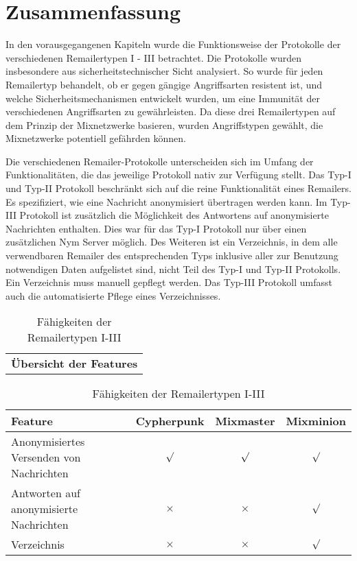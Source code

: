 \chapter{Zusammenfassung}

In den vorausgegangenen Kapiteln wurde die Funktionsweise der Protokolle der verschiedenen Remailertypen I - III betrachtet. Die Protokolle wurden insbesondere aus sicherheitstechnischer Sicht analysiert. So wurde für jeden Remailertyp behandelt, ob er gegen gängige Angriffsarten resistent ist, und welche Sicherheitsmechanismen entwickelt wurden, um eine Immunität der verschiedenen Angriffsarten zu gewährleisten.  Da diese drei Remailertypen auf dem Prinzip der Mixnetzwerke basieren, wurden Angriffstypen gewählt, die Mixnetzwerke potentiell gefährden können.

Die verschiedenen Remailer-Protokolle unterscheiden sich im Umfang der Funktionalitäten, die das jeweilige Protokoll nativ zur Verfügung stellt. Das Typ-I und Typ-II Protokoll beschränkt sich auf die reine Funktionalität eines Remailers. Es spezifiziert, wie eine Nachricht anonymisiert übertragen werden kann. Im Typ-III Protokoll ist zusätzlich die Möglichkeit des Antwortens auf anonymisierte Nachrichten enthalten. Dies war für das Typ-I Protokoll nur über einen zusätzlichen Nym Server möglich. Des Weiteren ist ein Verzeichnis, in dem alle verwendbaren Remailer des entsprechenden Typs inklusive aller zur Benutzung notwendigen Daten aufgelistet sind, nicht Teil des Typ-I und Typ-II Protokolls. Ein Verzeichnis muss manuell gepflegt werden. Das Typ-III Protokoll umfasst auch die automatisierte Pflege eines Verzeichnisses.

\begin{table}[htbp]
	\centering
	\begin{tabular}{c}
		\textbf{Übersicht der Features}
	\end{tabular}
		
	\begin{tabular}{m{7.5cm} || c | c | c}
		\hline
		\textbf{Feature} & \textbf{Cypherpunk} & \textbf{Mixmaster} & \textbf{Mixminion} \\
		\hline
		Anonymisiertes Versenden von Nachrichten & $\surd$ & $\surd$ & $\surd$ \\
		Antworten auf anonymisierte Nachrichten & $\times$ & $\times$ & $\surd$ \\
		Verzeichnis & $\times$ & $\times$ & $\surd$ \\
	\end{tabular}

	\caption{Fähigkeiten der Remailertypen I-III}
\end{table}


